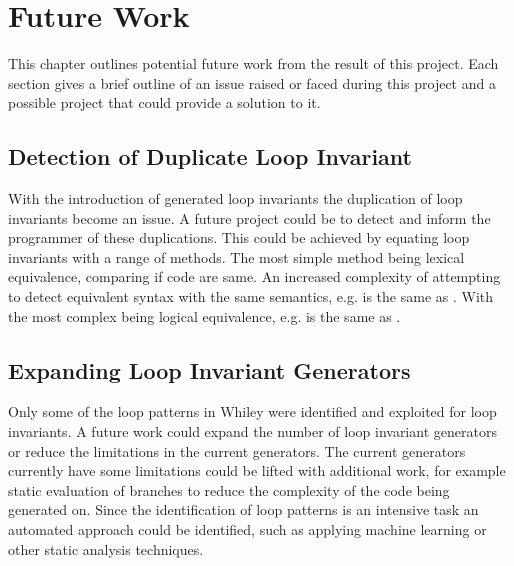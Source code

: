 \chapter{Future Work}\label{C:future}
This chapter outlines potential future work from the result of this project.
Each section gives a brief outline of an issue raised or faced during this
project and a possible project that could provide a solution to it.

\section{Detection of Duplicate Loop Invariant}

With the introduction of generated loop invariants the duplication of loop
invariants become an issue.
A future project could be to detect and inform the programmer of these
duplications.
This could be achieved by equating loop invariants with a range of methods.
The most simple method being lexical equivalence, comparing if code are same.
An increased complexity of attempting to detect equivalent syntax with the same
semantics, e.g.  is the same as .
With the most complex being logical equivalence, e.g.  is the same
as .


\section{Expanding Loop Invariant Generators}

Only some of the loop patterns in Whiley were identified and exploited for loop
invariants.
A future work could expand the number of loop invariant generators or reduce
the limitations in the current generators.
The current generators currently have some limitations could be lifted with
additional work, for example static evaluation of branches to reduce the
complexity of the code being generated on.
Since the identification of loop patterns is an intensive task an automated
approach could be identified, such as applying machine learning or other static
analysis techniques.

